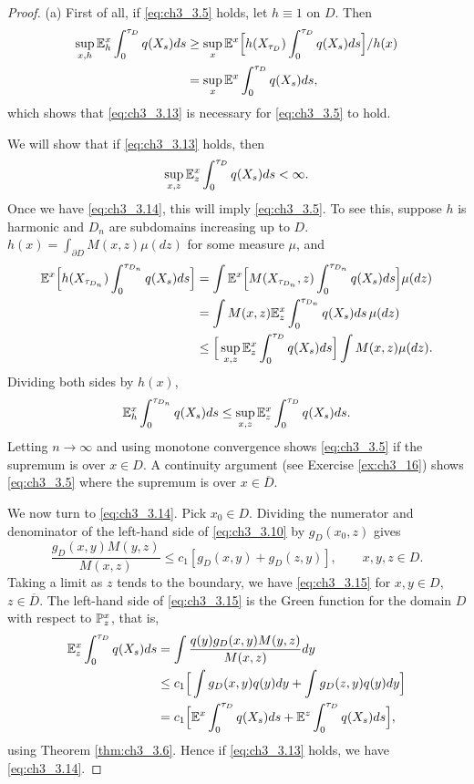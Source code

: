 \begin{proof}
(a) First of all, if \eqref{eq:ch3_3.5} holds, let $h \equiv 1$ on $D$. Then
\begin{align*}
    \sup_{x,h}\E_h^x \int_0^{\tau_D} q(X_s)ds &\geq \sup_x \E^x\Big[h(X_{\tau_D}) \int_0^{\tau_D} q(X_s)ds\Big]/h(x) \\
    &= \sup_x\E^x \int_0^{\tau_D} q(X_s)ds,
\end{align*}
which shows that \eqref{eq:ch3_3.13} is necessary for \eqref{eq:ch3_3.5} to hold.

We will show that if \eqref{eq:ch3_3.13} holds, then
\begin{equation}\label{eq:ch3_3.14}
    \sup_{x,z}\E_z^x \int_0^{\tau_D} q(X_s)ds < \infty.
\end{equation}
Once we have \eqref{eq:ch3_3.14}, this will imply \eqref{eq:ch3_3.5}. To see this, suppose $h$ is harmonic and $D_n$ are subdomains increasing up to $D$. $h(x) = \int_{\partial D} M(x,z)\mu(dz)$ for some measure $\mu$, and
\begin{align*}
    \E^x\Big[h(X_{\tau_{D_n}}) \int_0^{\tau_{D_n}} q(X_s)ds\Big] &= \int \E^x\Big[M(X_{\tau_{D_n}},z) \int_0^{\tau_{D_n}} q(X_s)ds\Big]\mu(dz) \\
    &= \int M(x,z)\E_z^x \int_0^{\tau_{D_n}} q(X_s)ds\,\mu(dz) \\
    &\leq \Big[\sup_{x,z} \E_z^x \int_0^{\tau_D} q(X_s)ds\Big] \int M(x,z)\mu(dz).
\end{align*}
Dividing both sides by $h(x)$,
\[
    \E_h^x \int_0^{\tau_{D_n}} q(X_s)ds \leq \sup_{x,z} \E_z^x \int_0^{\tau_D} q(X_s)ds.
\]
Letting $n \to \infty$ and using monotone convergence shows \eqref{eq:ch3_3.5} if the supremum is over $x \in D$. A continuity argument (see Exercise \ref{ex:ch3_16}) shows \eqref{eq:ch3_3.5} where the supremum is over $x \in \overline{D}$.

We now turn to \eqref{eq:ch3_3.14}. Pick $x_0 \in D$. Dividing the numerator and denominator of the left-hand side of \eqref{eq:ch3_3.10} by $g_D(x_0,z)$ gives
\mpagebreak
\begin{equation}\label{eq:ch3_3.15}
    \frac{g_D(x,y)M(y,z)}{M(x,z)} \leq c_1[g_D(x,y) + g_D(z,y)], \qquad x,y,z \in D.
\end{equation}
Taking a limit as $z$ tends to the boundary, we have \eqref{eq:ch3_3.15} for $x,y \in D$, $z \in \overline{D}$. The left-hand side of \eqref{eq:ch3_3.15} is the Green function for the domain $D$ with respect to $\P_z^x$, that is,
\begin{align*}
    \E_z^x \int_0^{\tau_D} q(X_s)ds &= \int \frac{q(y)g_D(x,y)M(y,z)}{M(x,z)}dy \\
    &\leq c_1\Big[\int g_D(x,y)q(y)dy + \int g_D(z,y)q(y)dy\Big] \\
    &= c_1\Big[\E^x \int_0^{\tau_D} q(X_s)ds + \E^z \int_0^{\tau_D} q(X_s)ds\Big],
\end{align*}
using Theorem \ref{thm:ch3_3.6}. Hence if \eqref{eq:ch3_3.13} holds, we have \eqref{eq:ch3_3.14}.


\end{proof}
